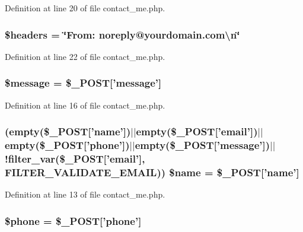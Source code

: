 Definition at line 20 of file contact\+\_\+me.\+php.

\hypertarget{contact__me_8php_a52500036ee807241b8b4b7e2367c49ef}{
\subsubsection[{\$headers}]{\setlength{\rightskip}{0pt plus 5cm}\$headers = \char`\"{}From\+: noreply@yourdomain.\+com\textbackslash{}n\char`\"{}}}\label{contact__me_8php_a52500036ee807241b8b4b7e2367c49ef}


Definition at line 22 of file contact\+\_\+me.\+php.

\hypertarget{contact__me_8php_abf17cb2dba2ed17cb28aa5f37deb5293}{
\subsubsection[{\$message}]{\setlength{\rightskip}{0pt plus 5cm}\$message = \$\+\_\+\+P\+O\+S\+T\mbox{[}'message'\mbox{]}}}\label{contact__me_8php_abf17cb2dba2ed17cb28aa5f37deb5293}


Definition at line 16 of file contact\+\_\+me.\+php.

\hypertarget{contact__me_8php_a278961b02c1c2852ff166f23bc231ea4}{
\subsubsection[{\$name}]{ (empty(\$\+\_\+\+P\+O\+S\+T\mbox{[}'name'\mbox{]})$\vert$$\vert$empty(\$\+\_\+\+P\+O\+S\+T\mbox{[}'email'\mbox{]})$\vert$$\vert$empty(\$\+\_\+\+P\+O\+S\+T\mbox{[}'phone'\mbox{]})$\vert$$\vert$empty(\$\+\_\+\+P\+O\+S\+T\mbox{[}'message'\mbox{]})$\vert$$\vert$!filter\+\_\+var(\$\+\_\+\+P\+O\+S\+T\mbox{[}'email'\mbox{]}, F\+I\+L\+T\+E\+R\+\_\+\+V\+A\+L\+I\+D\+A\+T\+E\+\_\+\+E\+M\+A\+I\+L)) \$name = \$\+\_\+\+P\+O\+S\+T\mbox{[}'name'\mbox{]}}}\label{contact__me_8php_a278961b02c1c2852ff166f23bc231ea4}


Definition at line 13 of file contact\+\_\+me.\+php.

\hypertarget{contact__me_8php_afca642079313f7c6c3f8d4368f779882}{
\subsubsection[{\$phone}]{\setlength{\rightskip}{0pt plus 5cm}\$phone = \$\+\_\+\+P\+O\+S\+T\mbox{[}'phone'\mbox{]}}}\label{contact__me_8php_afca642079313f7c6c3f8d4368f779882}



